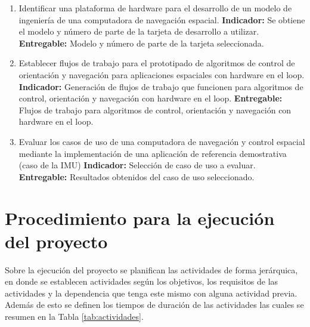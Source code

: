 \documentclass[12pt]{article}
\begin{document}
\begin{enumerate}
  \item Identificar una plataforma de hardware para el desarrollo de un modelo de ingeniería de una computadora de navegación espacial. \newline
        \textbf{Indicador:} Se obtiene el modelo y número de parte de la tarjeta de desarrollo a utilizar.\newline
        \textbf{Entregable:} Modelo y número de parte de la tarjeta seleccionada.
  \item Establecer flujos de trabajo para el prototipado de algoritmos de control de orientación y navegación para aplicaciones espaciales con hardware en el loop. \newline
        \textbf{Indicador:} Generación de flujos de trabajo que funcionen para algoritmos de control, orientación y navegación con hardware en el loop.\newline
        \textbf{Entregable:} Flujos de trabajo para algoritmos de control, orientación y navegación con hardware en el loop.
  \item Evaluar los casos de uso de una computadora de navegación y control espacial mediante la implementación de una aplicación de referencia demostrativa (caso de la IMU) \newline
        \textbf{Indicador:} Selección de caso de uso a evaluar.\newline
        \textbf{Entregable:} Resultados obtenidos del caso de uso seleccionado.
\end{enumerate}

\section{Procedimiento para la ejecución del proyecto}


Sobre la ejecución del proyecto se planifican las actividades de forma jerárquica, en donde se establecen actividades según los objetivos, los requisitos de las actividades y la dependencia que tenga este mismo con alguna actividad previa. Además de esto se definen los tiempos de duración de las actividades las cuales se resumen en la Tabla \ref{tab:actividades}.
\newpage
\end{document}
